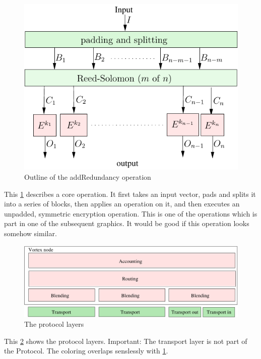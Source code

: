 \documentclass[11pt]{extarticle}
\begin{document}
	\begin{figure}[!h]\centering
		\includegraphics[width=0.8\columnwidth]{inc/addRedundancyOp}
		\caption{Outline of the addRedundancy operation}
		\label{fig:addRedundancyOperation}
	\end{figure}
	This \cref{fig:addRedundancyOperation} describes a core operation. It first takes an input vector, pads and splits it into a series of blocks, then applies an operation on it, and then executes an unpadded, symmetric encryption operation. This is one of the operations which is part in one of the subsequent graphics. It would be good if this operation looks somehow similar.
	 
	\begin{figure}[!h]
	 	\includegraphics[width=\textwidth]{inc/layerDesign}
	 	\caption{The protocol layers}
	 	\label{fig:protocolLayers}
	\end{figure}
	This \cref{fig:protocolLayers} shows the protocol layers. Important: The transport layer is not part of the Protocol. The coloring overlaps senslessly  with \cref{fig:addRedundancyOperation}.
	 
\end{document}

